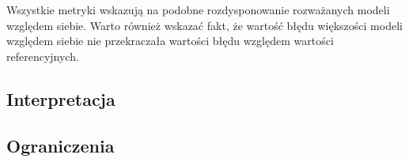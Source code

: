Wszystkie metryki wskazują na podobne rozdysponowanie rozważanych modeli względem siebie. Warto również wskazać
fakt, że wartość błędu większości modeli względem siebie nie przekraczała wartości błędu względem wartości
referencyjnych.


\subsection{Interpretacja}

\subsection{Ograniczenia}